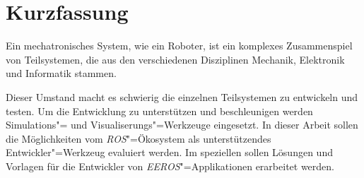 \chapter*{Kurzfassung}



Ein mechatronisches System, wie ein Roboter, ist ein komplexes Zusammenspiel von Teilsystemen, die aus den verschiedenen Disziplinen Mechanik, Elektronik und Informatik stammen.




Dieser Umstand macht es schwierig die einzelnen Teilsystemen zu entwickeln und testen.
Um die Entwicklung zu unterstützen und beschleunigen werden Simulations"= und Visualiserungs"=Werkzeuge eingesetzt.
In dieser Arbeit sollen die Möglichkeiten vom \textit{ROS}"=Ökosystem als unterstützendes Entwickler"=Werkzeug evaluiert werden.
Im speziellen sollen Lösungen und Vorlagen für die Entwickler von \textit{EEROS}"=Applikationen erarbeitet werden.


